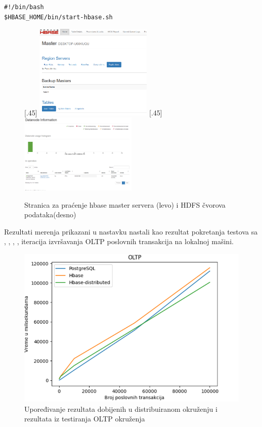 \documentclass[12pt,oneside]{memoir}
\begin{document}
\begin{lstlisting}[title={start-hbase.sh},captionpos=t]
#!/bin/bash
$HBASE_HOME/bin/start-hbase.sh
\end{lstlisting}

\begin{figure}[ht]
  \subcaptionbox*{}[.45\linewidth]{%
      \includegraphics[width=0.5\textwidth]{hbase-master.png}
  }%
  \hfill
  \subcaptionbox*{}[.45\linewidth]{%
      \includegraphics[width=0.5\textwidth]{datanode.png}
  }
  \caption{Stranica za praćenje hbase master servera (levo) i HDFS čvorova podataka(desno)}
\end{figure}


Rezultati merenja prikazani u nastavku nastali kao rezultat pokretanja testova sa , , , ,  iteracija izvršavanja OLTP poslovnih transakcija na lokalnoj mašini. 

\begin{figure}[!ht]
  \centering
  \includegraphics[width=1\textwidth]{dist-results.png}
  \caption{Upoređivanje rezultata dobijenih u distribuiranom okruženju i rezultata iz testiranja OLTP okruženja}
  \label{fig:grafikon}
\end{figure}
\end{document}
